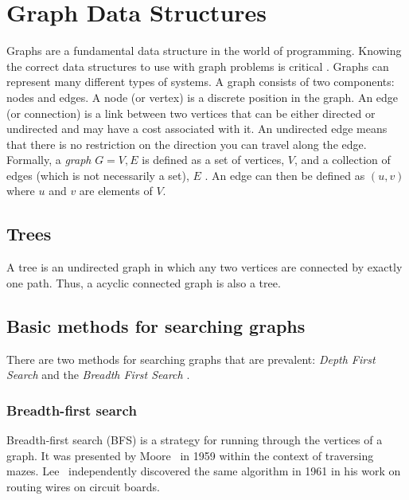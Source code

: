 \section{Graph Data Structures}


Graphs are a fundamental data structure in the world of programming.
Knowing the correct data structures to use with graph problems is critical \cite{topcoder}.
Graphs can represent many different types of systems.
A graph consists of two components: nodes and edges. 
A node (or vertex) is a discrete position in the graph. 
An edge (or connection) is a link between two vertices that can be either directed or undirected and may have a cost associated with it. 
An undirected edge means that there is no restriction on the direction you can travel along the edge. 
Formally, a \emph{graph} $G = {V, E}$ is defined as a set of vertices, $V$, and a collection of edges (which is not necessarily a set), $E$ \cite{berge1973graphs}.
An edge can then be defined as $(u, v)$ where $u$ and $v$ are elements of $V$.
%

\subsection{Trees}

A tree is an undirected graph in which any two vertices are connected by exactly one path. 
Thus, a acyclic connected graph is also a tree.


\subsection{Basic methods for searching graphs}


There are two methods for searching graphs that are prevalent: \emph{Depth First Search} and the \emph{Breadth First Search} \cite{joyner2010algorithmic}.

\subsubsection{Breadth-first search}

Breadth-first search (BFS) is a strategy for running through the
vertices of a graph. 
It was presented by Moore~\cite{Moore1959} in 1959 within the context of traversing mazes. 
Lee~\cite{Lee1961} independently discovered the same algorithm in 1961 in his work on routing wires on circuit boards.


